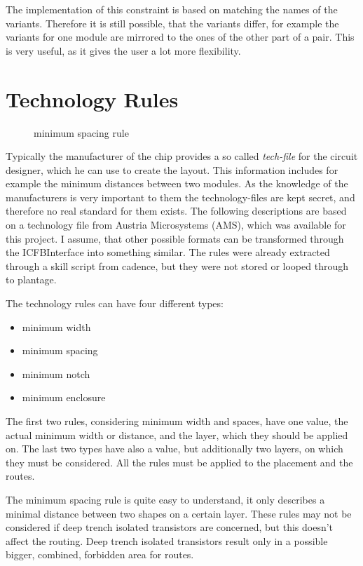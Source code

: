 The implementation of this constraint is based on matching the names of the variants. Therefore it is still possible, that the variants differ, for example the variants for one module are mirrored to the ones of the other part of a pair. This is very useful, as it gives the user a lot more flexibility.

\section{Technology Rules}

\begin{figure}
	\centering
	
	\caption{minimum spacing rule}
	\label{fig:technology_rule_spacing}
\end{figure}

Typically the manufacturer of the chip provides a so called \textit{tech-file} for the circuit designer, which he can use to create the layout. This information includes for example the minimum distances between two modules. As the knowledge of the manufacturers is very important to them the technology-files are kept secret, and therefore no real standard for them exists. The following descriptions are based on a technology file from Austria Microsystems (AMS), which was available for this project. I assume, that other possible formats can be transformed through the ICFBInterface into something similar. The rules were already extracted through a skill script from cadence, but they were not stored or looped through to plantage. 

The technology rules can have four different types:

\begin{itemize}
\item minimum width
\item minimum spacing
\item minimum notch
\item minimum enclosure
\end{itemize}

The first two rules, considering minimum width and spaces, have one value, the actual minimum width or distance, and the layer, which they should be applied on. The last two types have also a value, but additionally two layers, on which they must be considered. All the rules must be applied to the placement and the routes.

The minimum spacing rule  is quite easy to understand, it only describes a minimal distance between two shapes on a certain layer. These rules may not be considered if deep trench isolated transistors are concerned, but this doesn't affect the routing. Deep trench isolated transistors result only in a possible bigger, combined, forbidden area for routes.

